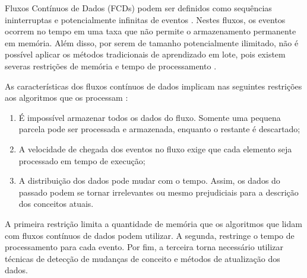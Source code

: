 
Fluxos Contínuos de Dados (FCDs) podem ser definidos como sequências ininterruptas e potencialmente infinitas de eventos \cite{Aggarwal:2006:DSM:1196418}.
%
Nestes fluxos, os eventos ocorrem no tempo em uma taxa que não permite o armazenamento permanente em memória.
%
Além disso, por serem de tamanho potencialmente ilimitado, não é possível aplicar os métodos tradicionais de aprendizado em lote, pois existem severas restrições de memória e tempo de processamento \cite{Gama:2007:LDS:1349782}.

As características dos fluxos contínuos de dados implicam nas seguintes restrições aos algoritmos que os processam \cite{bifet2009data}:
%
\begin{enumerate}
    \item É impossível armazenar todos os dados do fluxo. Somente uma pequena parcela pode ser processada e armazenada, enquanto o restante é descartado;
    \item A velocidade de chegada dos eventos no fluxo exige que cada elemento seja processado em tempo de execução;
    \item A distribuição dos dados pode mudar com o tempo. Assim, os dados do passado podem se tornar irrelevantes ou mesmo prejudiciais para a descrição dos conceitos atuais.
\end{enumerate}

A primeira restrição limita a quantidade de memória que os algoritmos que lidam com fluxos contínuos de dados podem utilizar.
%
A segunda, restringe o tempo de processamento para cada evento.
%
Por fim, a terceira torna necessário utilizar técnicas de detecção de mudanças de conceito e métodos de atualização dos dados.
%

